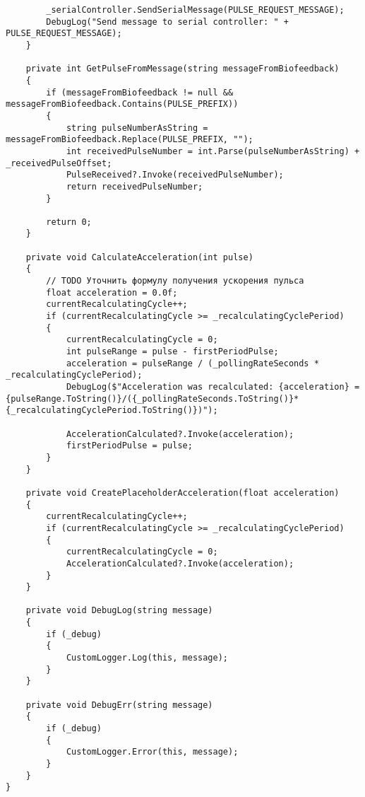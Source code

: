 \begin{verbatim}
        _serialController.SendSerialMessage(PULSE_REQUEST_MESSAGE);
        DebugLog("Send message to serial controller: " + PULSE_REQUEST_MESSAGE);
    }

    private int GetPulseFromMessage(string messageFromBiofeedback)
    {
        if (messageFromBiofeedback != null && messageFromBiofeedback.Contains(PULSE_PREFIX))
        {
            string pulseNumberAsString = messageFromBiofeedback.Replace(PULSE_PREFIX, "");
            int receivedPulseNumber = int.Parse(pulseNumberAsString) + _receivedPulseOffset;
            PulseReceived?.Invoke(receivedPulseNumber);
            return receivedPulseNumber;
        }

        return 0;
    }

    private void CalculateAcceleration(int pulse)
    {
        // TODO Уточнить формулу получения ускорения пульса
        float acceleration = 0.0f;
        currentRecalculatingCycle++;
        if (currentRecalculatingCycle >= _recalculatingCyclePeriod)
        {
            currentRecalculatingCycle = 0;
            int pulseRange = pulse - firstPeriodPulse;
            acceleration = pulseRange / (_pollingRateSeconds * _recalculatingCyclePeriod);
            DebugLog($"Acceleration was recalculated: {acceleration} = {pulseRange.ToString()}/({_pollingRateSeconds.ToString()}*{_recalculatingCyclePeriod.ToString()})");

            AccelerationCalculated?.Invoke(acceleration);
            firstPeriodPulse = pulse;
        }
    }

    private void CreatePlaceholderAcceleration(float acceleration)
    {
        currentRecalculatingCycle++;
        if (currentRecalculatingCycle >= _recalculatingCyclePeriod)
        {
            currentRecalculatingCycle = 0;
            AccelerationCalculated?.Invoke(acceleration);
        }
    }

    private void DebugLog(string message)
    {
        if (_debug)
        {
            CustomLogger.Log(this, message);
        }
    }

    private void DebugErr(string message)
    {
        if (_debug)
        {
            CustomLogger.Error(this, message);
        }
    }
}
\end{verbatim}

